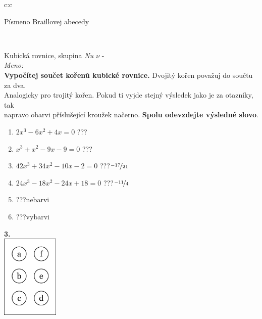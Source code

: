 \documentclass[10pt]{report}
\begin{document}
\begin{tabular}{c:c}
\begin{minipage}[c][99mm][t]{0.49\linewidth}
\begin{center}
\begin{minipage}{0.20\linewidth}
\begin{center}
{\small Písmeno Braillovej abecedy}
\end{center}
\end{minipage}
\end{center}
\end{minipage}
\\ \hdashline
\begin{minipage}[c][99mm][t]{0.49\linewidth}
\begin{center}
\vspace{7mm}
{\huge Kubická rovnice, skupina \textit{Nu $\nu$} -}\\[4.5mm]
\textit{Meno:}\phantom{xxxxxxxxxxxxxxxxxxxxxxxxxxxxxxxxxxxxxxxxxxxxxxxxxxxxxxxxxxxxxxxxx}\\[3.5mm]
\textbf{Vypočítej součet kořenů kubické rovnice.} Dvojitý kořen považuj do součtu za dva.\\Analogicky pro trojitý kořen. Pokud ti vyjde stejný výsledek jako je za otazníky, tak\\napravo obarvi příslušející kroužek načerno. \textbf{Spolu odevzdejte výsledné slovo}.\\[3mm]
\begin{minipage}{0.77\linewidth}
\begin{center}
\begin{varwidth}{\textwidth}
\begin{enumerate}
\large
\item $2x^3-6x^2+4x=0$\quad \dotfill\; ???\;\dotfill {}
\item $x^3+x^2-9x-9=0$\quad \dotfill\; ???\;\dotfill {}
\item $42x^3+34x^2-10x-2=0$\quad \dotfill\; ???\;\dotfill \quad $\nicefrac{-17}{21}$
\item $24x^3-18x^2-24x+18=0$\quad \dotfill\; ???\;\dotfill \quad $\nicefrac{-11}{4}$
\item \quad \dotfill\; ???\;\dotfill \quad nebarvi
\item \quad \dotfill\; ???\;\dotfill \quad vybarvi
\end{enumerate}
\end{varwidth}
\end{center}
\end{minipage}
\begin{minipage}{0.20\linewidth}
\begin{center}
{\Huge\bfseries 3.} \\[2mm]
\includegraphics[height=40mm]{../images/braille.png}

\end{center}
\end{minipage}
\end{center}
\end{minipage}
\end{tabular}
\end{document}
